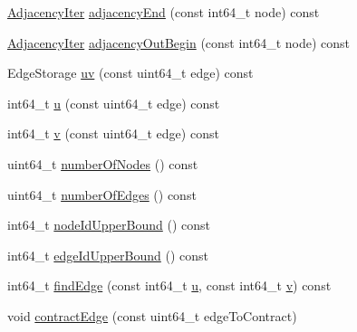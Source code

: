 \begin{DoxyCompactItemize}
\item 
\hyperlink{classnifty_1_1graph_1_1EdgeContractionGraphWithSets_ab4782e97223ab8ba2d207325aae693d6}{Adjacency\+Iter} \hyperlink{classnifty_1_1graph_1_1EdgeContractionGraphWithSets_a80ba6846ff642ebdc31b93c9f8116abf}{adjacency\+End} (const int64\+\_\+t node) const 
\item 
\hyperlink{classnifty_1_1graph_1_1EdgeContractionGraphWithSets_ab4782e97223ab8ba2d207325aae693d6}{Adjacency\+Iter} \hyperlink{classnifty_1_1graph_1_1EdgeContractionGraphWithSets_a21ec4a0e7b2cb6f06761521066003a34}{adjacency\+Out\+Begin} (const int64\+\_\+t node) const 
\item 
Edge\+Storage \hyperlink{classnifty_1_1graph_1_1EdgeContractionGraphWithSets_a1a59be69bf3915f39c1492c62e098e09}{uv} (const uint64\+\_\+t edge) const 
\item 
int64\+\_\+t \hyperlink{classnifty_1_1graph_1_1EdgeContractionGraphWithSets_ab6a9c6b0b9bf368511c15b7a544b22a8}{u} (const uint64\+\_\+t edge) const 
\item 
int64\+\_\+t \hyperlink{classnifty_1_1graph_1_1EdgeContractionGraphWithSets_a98b71392054a18ce0dc9ae501f2b50fa}{v} (const uint64\+\_\+t edge) const 
\item 
uint64\+\_\+t \hyperlink{classnifty_1_1graph_1_1EdgeContractionGraphWithSets_ac7b95bcd4775eb6ebf43dd19c6db5eb0}{number\+Of\+Nodes} () const 
\item 
uint64\+\_\+t \hyperlink{classnifty_1_1graph_1_1EdgeContractionGraphWithSets_a1921bd2bbb2f6e9ba566410140997c11}{number\+Of\+Edges} () const 
\item 
int64\+\_\+t \hyperlink{classnifty_1_1graph_1_1EdgeContractionGraphWithSets_a5b7960306ee794f32b677881a1e0f692}{node\+Id\+Upper\+Bound} () const 
\item 
int64\+\_\+t \hyperlink{classnifty_1_1graph_1_1EdgeContractionGraphWithSets_a3468f49ec6597765d7e09729e2cf8353}{edge\+Id\+Upper\+Bound} () const 
\item 
int64\+\_\+t \hyperlink{classnifty_1_1graph_1_1EdgeContractionGraphWithSets_ac3944f85e26450f450cd2837a0e09eee}{find\+Edge} (const int64\+\_\+t \hyperlink{classnifty_1_1graph_1_1EdgeContractionGraphWithSets_ab6a9c6b0b9bf368511c15b7a544b22a8}{u}, const int64\+\_\+t \hyperlink{classnifty_1_1graph_1_1EdgeContractionGraphWithSets_a98b71392054a18ce0dc9ae501f2b50fa}{v}) const 
\item 
void \hyperlink{classnifty_1_1graph_1_1EdgeContractionGraphWithSets_aac2039e7aa273ca72a664636284e094c}{contract\+Edge} (const uint64\+\_\+t edge\+To\+Contract)
\item 

\end{DoxyCompactItemize}
